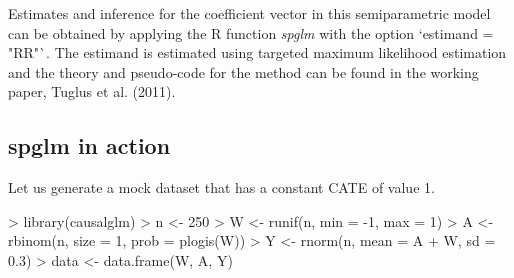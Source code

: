 \documentclass[article]{jss}
\begin{document}
Estimates and inference for the coefficient vector in this semiparametric model can be obtained by applying the R function \textit{spglm} with the option `estimand = "RR"`. The estimand is estimated using targeted maximum likelihood estimation and the theory and pseudo-code for the method can be found in the working paper, Tuglus et al. (2011).\nocite{TMLERR} 

\subsection{spglm in action}

Let us generate a mock dataset that has a constant CATE of value 1.
\begin{Schunk}
\begin{Sinput}
> library(causalglm)
> n <- 250
> W <- runif(n, min = -1, max = 1)
> A <- rbinom(n, size = 1, prob = plogis(W))
> Y <- rnorm(n, mean = A + W, sd = 0.3)
> data <- data.frame(W, A, Y)
\end{Sinput}
\end{Schunk}
\end{document}
